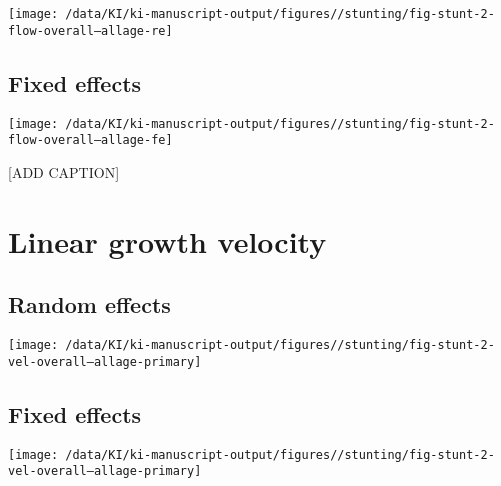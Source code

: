 \documentclass[
  9pt,
]{book}
\begin{document}
\texttt{[image: /data/KI/ki-manuscript-output/figures//stunting/fig-stunt-2-flow-overall--allage-re]}

\hypertarget{fixed-effects-3}{%
\subsection{Fixed effects}\label{fixed-effects-3}}

\texttt{[image: /data/KI/ki-manuscript-output/figures//stunting/fig-stunt-2-flow-overall--allage-fe]}

{[}ADD CAPTION{]}

\hypertarget{linear-growth-velocity-1}{%
\section{Linear growth velocity}\label{linear-growth-velocity-1}}

\hypertarget{random-effects-3}{%
\subsection{Random effects}\label{random-effects-3}}

\texttt{[image: /data/KI/ki-manuscript-output/figures//stunting/fig-stunt-2-vel-overall--allage-primary]}

\hypertarget{fixed-effects-4}{%
\subsection{Fixed effects}\label{fixed-effects-4}}

\texttt{[image: /data/KI/ki-manuscript-output/figures//stunting/fig-stunt-2-vel-overall--allage-primary]}

  
\end{document}
